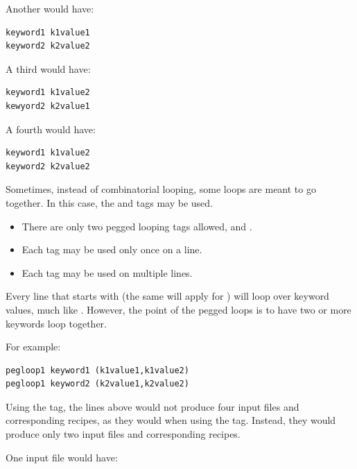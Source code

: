 \documentclass[letterpaper,10pt,english]{sphinxmanual}
\begin{document}
Another would have:

\begin{Verbatim}[commandchars=\\\{\}]
keyword1 k1value1
keyword2 k2value2
\end{Verbatim}

A third would have:

\begin{Verbatim}[commandchars=\\\{\}]
keyword1 k1value2
kewyord2 k2value1
\end{Verbatim}

A fourth would have:

\begin{Verbatim}[commandchars=\\\{\}]
keyword1 k1value2
keyword2 k2value2
\end{Verbatim}

Sometimes, instead of combinatorial looping, some loops are meant to go together. In this case, the  and  tags may be used.
\begin{itemize}
\item {} 
There are only two pegged looping tags allowed,  and .

\item {} 
Each tag may be used only once on a line.

\item {} 
Each tag may be used on multiple lines.

\end{itemize}

Every line that starts with  (the same will apply for ) will loop over keyword values, much like . However, the point of the pegged loops is to have two or more keywords loop together.

For example:

\begin{Verbatim}[commandchars=\\\{\}]
pegloop1 keyword1 (k1value1,k1value2)
pegloop1 keyword2 (k2value1,k2value2)
\end{Verbatim}

Using the  tag, the lines above would not produce four input files and corresponding recipes, as they would when using the  tag. Instead, they would produce only two input files and corresponding recipes.

One input file would have:
\end{document}

